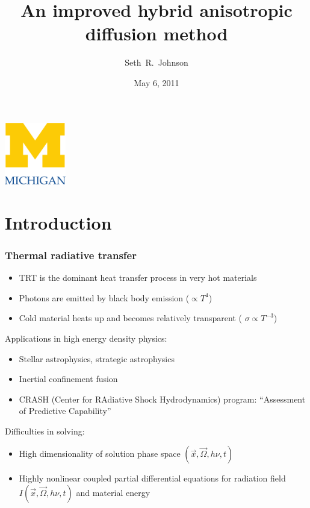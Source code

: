 \documentclass{beamer}
\title[ORNL Seminar]%
{An improved hybrid anisotropic diffusion method}
\author[SRJ]{Seth~R.~Johnson}
\institute[UMich]{
University of Michigan, Ann Arbor
}
\date[5/6/2011]{May 6, 2011}
\begin{document}

\begin{frame}
\titlepage
\begin{center}
  \includegraphics[width=0.2\textwidth]{../figures/umlogo}
\end{center}
\end{frame}

\section{Introduction}
\begin{frame}
  \frametitle{Thermal radiative transfer}
  \begin{itemize}
    \item TRT is the dominant heat transfer process in very hot materials
    \item Photons are emitted by black body emission ($\propto T^4$)
    \item Cold material heats up and becomes relatively transparent (
      $\sigma\propto T^{-3}$)
  \end{itemize}

  Applications in high energy density physics:
  \begin{itemize}
    \item Stellar astrophysics, \textcolor[gray]{.5}{strategic astrophysics}
    \item Inertial confinement fusion
    \item CRASH (Center for RAdiative Shock Hydrodynamics) program: ``Assessment
          of Predictive Capability''
  \end{itemize}
  Difficulties in solving:
  \begin{itemize}
    \item High dimensionality of solution phase space $(\vec{x}, \vec{\Omega},
      h\nu, t)$
    \item Highly nonlinear coupled partial differential equations for radiation
      field $I(\vec{x}, \vec{\Omega}, h\nu, t)$ and material energy
  \end{itemize}
\end{frame}
\end{document}
